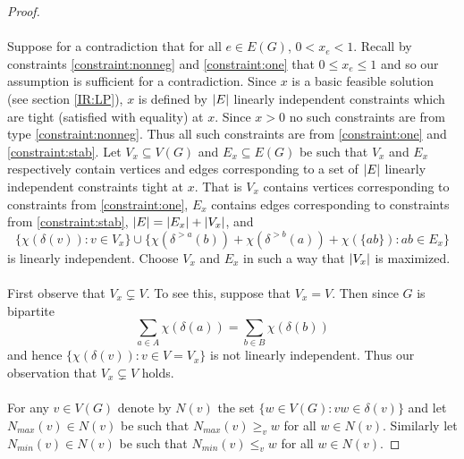 \begin{proof}
\paragraph{}
Suppose for a contradiction that for all $e \in E(G)$, $0 <x_e < 1$. Recall by constraints \ref{constraint:nonneg} and \ref{constraint:one} that $0 \leq x_e \leq 1$ and so our assumption is sufficient for a contradiction. Since $x$ is a basic feasible solution (see section \ref{IR:LP}), $x$ is defined by $\left|E\right|$ linearly independent constraints which are tight (satisfied with equality) at $x$. Since $x > 0$ no such constraints are from type \ref{constraint:nonneg}. Thus all such constraints are from \ref{constraint:one} and \ref{constraint:stab}. Let $V_x \subseteq V(G)$ and $E_x \subseteq E(G)$ be such that $V_x$ and $E_x$ respectively contain vertices and edges corresponding to a set of $\left|E\right|$ linearly independent constraints tight at $x$. That is $V_x$ contains vertices corresponding to constraints from \ref{constraint:one}, $E_x$ contains edges corresponding to constraints from \ref{constraint:stab}, $\left|E\right| = \left|E_x\right| + \left|V_x\right|$, and $$\{\chi(\delta(v)) : v \in V_x\} \cup \{\chi(\delta^{>a}(b)) + \chi(\delta^{>b}(a)) + \chi(\{ab\}): ab \in E_x\}$$ is linearly independent. Choose $V_x$ and $E_x$ in such a way that $\left|V_x\right|$ is maximized.
\paragraph{}
First observe that $V_x \subsetneq V$. To see this, suppose that $V_x = V$. Then since $G$ is bipartite
$$\sum_{a \in A} \chi(\delta(a)) = \sum_{b \in B} \chi(\delta(b))$$
and hence $\{\chi(\delta(v)) : v \in V=V_x\}$ is not linearly independent. Thus our observation that $V_x \subsetneq V$ holds.
\paragraph{}
For any $v \in V(G)$ denote by $N(v)$ the set $\{ w \in V(G): vw \in \delta(v)\}$ and let $N_{max}(v) \in N(v)$ be such that $N_{max}(v) \geq_v w$ for all $w \in N(v)$. Similarly let $N_{min}(v) \in N(v)$ be such that $N_{min}(v) \leq_v w$ for all $w \in N(v)$.

\end{proof}
